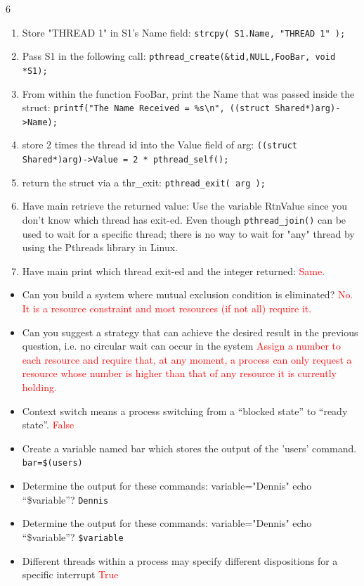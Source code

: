 \documentclass[9pt,landscape]{memoir}
\newcommand{\answer}[1]{\textcolor{red}{#1}}
\begin{document}
\begin{multicols}{6}
\begin{enumerate}
    \item Store "THREAD 1" in S1's Name field:  \verb$strcpy( S1.Name, "THREAD 1" );$
    \item Pass S1 in the following call:  \verb$pthread_create(&tid,NULL,FooBar, void *S1);$
    \item From within the function FooBar, print the Name that was passed inside the struct:  \texttt{printf("The Name Received = \%s\textbackslash n", ((struct Shared*)arg)->Name);}
    \item store 2 times the thread id into the Value field of arg:  \verb$((struct Shared*)arg)->Value = 2 * pthread_self();$
    \item return the struct via a thr\_exit: \verb$pthread_exit( arg );$
    \item Have main retrieve the returned value:  Use the variable RtnValue since you don't know which thread has exit-ed. Even though \verb$pthread_join()$ can be used to wait for a specific thread; there is no way to wait for "any" thread by using the Pthreads library in Linux.
    \item Have main print which thread exit-ed and the integer returned: \answer{Same.}
\end{enumerate}
\hfill
\begin{itemize}
    \item Can you build a system where mutual exclusion condition is eliminated?  \answer{No. It is a resource constraint and most resources (if not all) require it.}
    \item Can you suggest a strategy that can achieve the desired result in the previous question, i.e. no circular wait can occur in the system \answer{Assign a number to each resource and require that, at any moment, a process can only request a resource whose number is higher than that of any resource it is currently holding.}
    \item Context switch means a process switching from a ``blocked state'' to ``ready state''.  \answer{False}
    \item Create a variable named bar which stores the output of the 'users' command. \verb|bar=$(users)|
    \item Determine the output for these commands: variable="Dennis" echo ``\$variable''? \verb$Dennis$
    \item Determine the output for these commands: variable="Dennis" echo ``\$variable''? \verb|$variable|
    \item Different threads within a process may specify different dispositions for a specific interrupt \answer{True}

\end{itemize}
\end{multicols}
\end{document}
